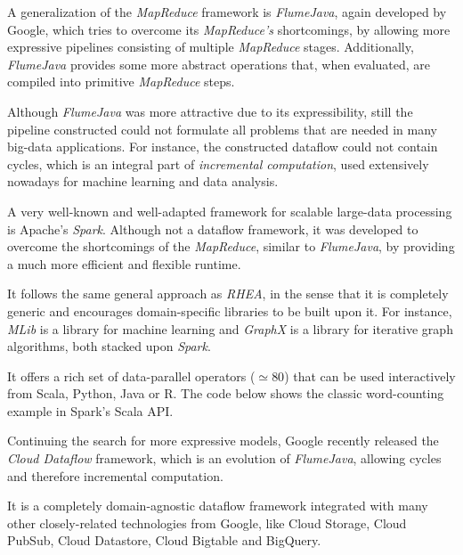 \documentclass{dithesis}
\begin{document}

A generalization of the \textit{MapReduce} framework is \textit{FlumeJava}, again developed by Google, which tries to overcome its \textit{MapReduce's } shortcomings, by allowing more expressive pipelines consisting of multiple \textit{MapReduce} stages. Additionally, \textit{FlumeJava} provides some more abstract operations that, when evaluated, are compiled into primitive \textit{MapReduce} steps.

Although \textit{FlumeJava} was more attractive due to its expressibility, still the pipeline constructed could not formulate all problems that are needed in many big-data applications. For instance, the constructed dataflow could not contain cycles, which is an integral part of \textit{incremental computation}, used extensively nowadays for machine learning and data analysis.


A very well-known and well-adapted framework for scalable large-data processing is Apache's \textit{Spark}\cite{spark}. Although not a dataflow framework, it was developed to overcome the shortcomings of the \textit{MapReduce}, similar to \textit{FlumeJava}, by providing a much more efficient and flexible runtime.

It follows the same general approach as \textit{RHEA}, in the sense that it is completely generic and encourages domain-specific libraries to be built upon it. For instance, \textit{MLib} is a library for machine learning and \textit{GraphX} is a library for iterative graph algorithms, both stacked upon \textit{Spark}.

It offers a rich set of data-parallel operators ($\simeq 80$) that can be used interactively from Scala, Python, Java or R. The code below shows the classic word-counting example in Spark's Scala API.



Continuing the search for more expressive models, Google recently released the \textit{Cloud Dataflow} framework\cite{google_dataflow}, which is an evolution of \textit{FlumeJava}\cite{flumejava}, allowing cycles and therefore incremental computation.

It is a completely domain-agnostic dataflow framework integrated with many other closely-related technologies from Google, like Cloud Storage, Cloud PubSub, Cloud Datastore, Cloud Bigtable and BigQuery. 
\end{document}
